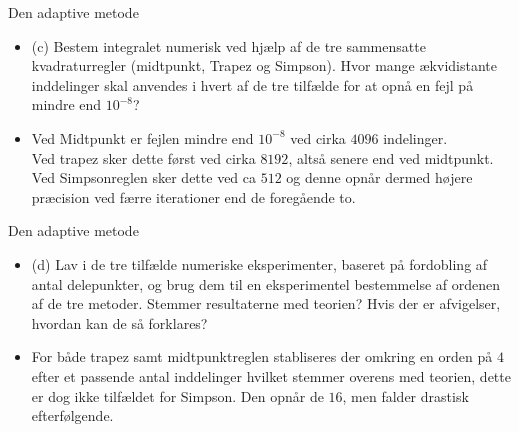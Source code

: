 \begin{frame}{Den adaptive metode}
    \begin{itemize}
        \item (c) Bestem integralet numerisk ved hjælp af de tre sammensatte kvadraturregler (midtpunkt, Trapez og Simpson). 
        Hvor mange ækvidistante inddelinger skal anvendes i hvert af de tre tilfælde for at opnå en fejl på mindre end $10^{-8}$?
        \item Ved Midtpunkt er fejlen mindre end $10^{-8}$ ved cirka $4096$ indelinger.\\
        Ved trapez sker dette først ved cirka $8192$, altså senere end ved midtpunkt.\\ 
        Ved Simpsonreglen sker dette ved ca $512$ og denne opnår dermed højere præcision ved færre iterationer end de foregående to.
    \end{itemize} 
\end{frame}


\begin{frame}{Den adaptive metode}
    \begin{itemize}
        \item (d) Lav i de tre tilfælde numeriske eksperimenter, baseret på fordobling af antal delepunkter, og brug dem til en eksperimentel bestemmelse af ordenen af de tre metoder. 
        Stemmer resultaterne med teorien? Hvis der er afvigelser, hvordan kan
        de så forklares?
        \item For både trapez samt midtpunktreglen stabliseres der omkring en orden på $4$ efter et passende antal inddelinger hvilket stemmer overens med teorien, dette er dog ikke tilfældet for Simpson. Den opnår de $16$, men falder drastisk efterfølgende.
    \end{itemize}
\end{frame}


